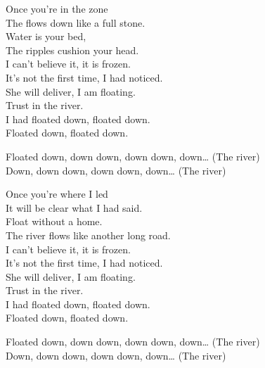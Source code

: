 
\label{album:quarters}





Once you're in the zone \\
The  flows down like a full stone. \\
Water is your bed, \\
The ripples cushion your head. \\

I can't believe it, it is frozen. \\
It's not the first time, I had noticed. \\
She will deliver, I am floating. \\
Trust in the river. \\
I had floated down, floated down. \\
Floated down, floated down. \\


Floated down, down down, down down, down… (The river) \\
Down, down down, down down, down… (The river) \\


Once you're where I led \\
It will be clear what I had said. \\
Float without a home. \\
The river flows like another long road. \\

I can't believe it, it is frozen. \\
It's not the first time, I had noticed. \\
She will deliver, I am floating. \\
Trust in the river. \\
I had floated down, floated down. \\
Floated down, floated down. \\


Floated down, down down, down down, down… (The river) \\
Down, down down, down down, down… (The river) \\

